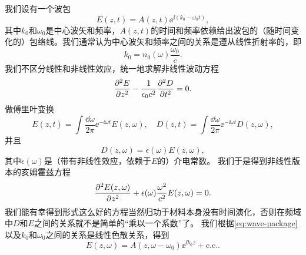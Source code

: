 我们设有一个波包
\begin{equation}
    E(z, t) = A(z, t) \ee^{\ii (k_0 - \omega_0 t)},
    \label{eq:wave-package}
\end{equation}
其中$k_0$和$\omega_0$是中心波矢和频率，$A(z, t)$的时间和频率依赖给出波包的（随时间变化的）包络线。我们通常认为中心波矢和频率之间的关系是遵从线性折射率的，即
\begin{equation}
    k_0 = n_0(\omega) \frac{\omega_0}{c}.
\end{equation}
我们不区分线性和非线性效应，统一地求解非线性波动方程
\[
    \pdv[2]{E}{z} - \frac{1}{\epsilon_0 c^2} \pdv[2]{D}{t} = 0.
\]
做傅里叶变换
\[
    E(z, t) = \int \frac{\dd{\omega}}{2\pi} \ee^{- \ii \omega t} E(z, \omega), \quad D(z, t) = \int \frac{\dd{\omega}}{2\pi} \ee^{- \ii \omega t} D(z, \omega),
\]
并且
\[
    D(z, \omega) = \epsilon(\omega) E(z, \omega),
\]
其中$\epsilon(\omega)$是（带有非线性效应，依赖于$E$的）介电常数。
我们于是得到非线性版本的亥姆霍兹方程
\begin{equation}
    \pdv[2]{E(z, \omega)}{z} + \epsilon(\omega) \frac{\omega^2}{c^2} E(z, \omega) = 0.
    \label{eq:nonlinear-freq-domain-eq}
\end{equation}
我们能有幸得到形式这么好的方程当然归功于材料本身没有时间演化，否则在频域中$D$和$E$之间的关系就不是简单的“乘以一个系数”了。
我们根据\eqref{eq:wave-package}以及$k_0$和$\omega_0$之间的关系是线性色散关系，得到
\begin{equation}
    E(z, \omega) = A(z, \omega - \omega_0) \ee^{\ii k_0 z } + \text{c.c.}.
\end{equation}

